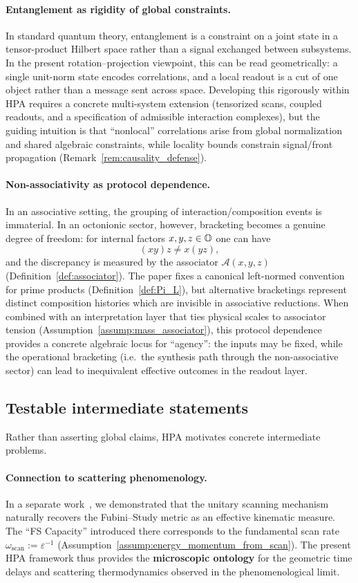 \paragraph{Entanglement as rigidity of global constraints.}
In standard quantum theory, entanglement is a constraint on a joint state in a tensor-product Hilbert space rather than a signal exchanged between subsystems.
In the present rotation--projection viewpoint, this can be read geometrically: a single unit-norm state encodes correlations, and a local readout is a cut of one object rather than a message sent across space.
Developing this rigorously within HPA requires a concrete multi-system extension (tensorized scans, coupled readouts, and a specification of admissible interaction complexes), but the guiding intuition is that ``nonlocal'' correlations arise from global normalization and shared algebraic constraints, while locality bounds constrain signal/front propagation (Remark~\ref{rem:causality_defense}).

\paragraph{Non-associativity as protocol dependence.}
In an associative setting, the grouping of interaction/composition events is immaterial. In an octonionic sector, however, bracketing becomes a genuine degree of freedom: for internal factors $x,y,z\in\mathbb{O}$ one can have
$$
(xy)z\ne x(yz),
$$
and the discrepancy is measured by the associator $\mathcal{A}(x,y,z)$ (Definition~\ref{def:associator}).
The paper fixes a canonical left-normed convention for prime products (Definition~\ref{def:Pi_L}), but alternative bracketings represent distinct composition histories which are invisible in associative reductions.
When combined with an interpretation layer that ties physical scales to associator tension (Assumption~\ref{assump:mass_associator}), this protocol dependence provides a concrete algebraic locus for ``agency'': the inputs may be fixed, while the operational bracketing (i.e.\ the synthesis path through the non-associative sector) can lead to inequivalent effective outcomes in the readout layer.

\subsection{Testable intermediate statements}
Rather than asserting global claims, HPA motivates concrete intermediate problems.

\paragraph{Connection to scattering phenomenology.}
In a separate work~\cite{Ma2025FSTime}, we demonstrated that the unitary scanning mechanism naturally recovers the Fubini--Study metric as an effective kinematic measure. The ``FS Capacity'' introduced there corresponds to the fundamental scan rate $\omega_{\mathrm{scan}}:=\varepsilon^{-1}$ (Assumption~\ref{assump:energy_momentum_from_scan}). The present HPA framework thus provides the \textbf{microscopic ontology} for the geometric time delays and scattering thermodynamics observed in the phenomenological limit.


